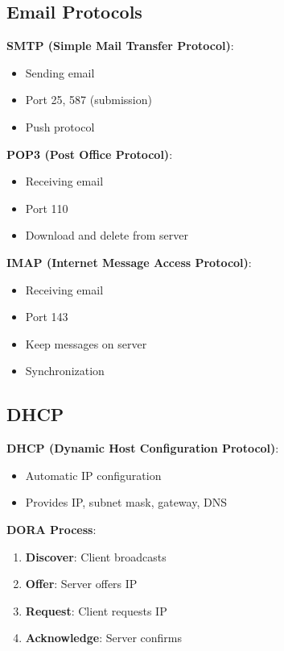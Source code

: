 \documentclass[12pt,a4paper]{report}
\begin{document}
\subsection{Email Protocols}
\begin{concept}
\textbf{SMTP (Simple Mail Transfer Protocol)}:
\begin{itemize}
    \item Sending email
    \item Port 25, 587 (submission)
    \item Push protocol
\end{itemize}

\textbf{POP3 (Post Office Protocol)}:
\begin{itemize}
    \item Receiving email
    \item Port 110
    \item Download and delete from server
\end{itemize}

\textbf{IMAP (Internet Message Access Protocol)}:
\begin{itemize}
    \item Receiving email
    \item Port 143
    \item Keep messages on server
    \item Synchronization
\end{itemize}
\end{concept}

\subsection{DHCP}
\begin{concept}
\textbf{DHCP (Dynamic Host Configuration Protocol)}:
\begin{itemize}
    \item Automatic IP configuration
    \item Provides IP, subnet mask, gateway, DNS
\end{itemize}

\textbf{DORA Process}:
\begin{enumerate}
    \item \textbf{Discover}: Client broadcasts
    \item \textbf{Offer}: Server offers IP
    \item \textbf{Request}: Client requests IP
    \item \textbf{Acknowledge}: Server confirms
\end{enumerate}
\end{concept}
\end{document}
